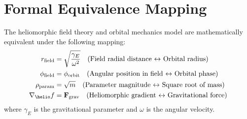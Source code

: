 \section{Formal Equivalence Mapping}

\begin{theorem}
The heliomorphic field theory and orbital mechanics model are mathematically equivalent under the following mapping:
\begin{align}
    r_{\text{field}} &= \sqrt{\frac{\gamma_E}{\omega^2}} \quad \text{(Field radial distance $\leftrightarrow$ Orbital radius)}\\
    \phi_{\text{field}} &= \phi_{\text{orbit}} \quad \text{(Angular position in field $\leftrightarrow$ Orbital phase)} \\
    \rho_{\text{param}} &= \sqrt{m} \quad \text{(Parameter magnitude $\leftrightarrow$ Square root of mass)} \\
    \nabla_{\helio}f &= \mathbf{F}_{\text{grav}} \quad \text{(Heliomorphic gradient $\leftrightarrow$ Gravitational force)}
\end{align}
where $\gamma_E$ is the gravitational parameter and $\omega$ is the angular velocity.
\end{theorem}

